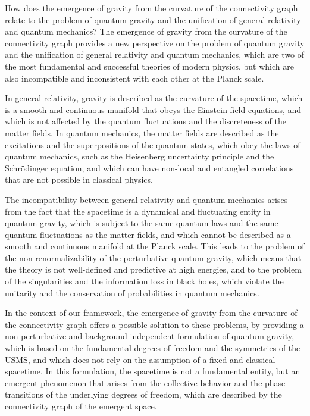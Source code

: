\begin{tcolorbox}[colback=green!5!white,colframe=green!75!black,title=Question]
    How does the emergence of gravity from the curvature of the connectivity graph relate to the problem of quantum gravity and the unification of general relativity and quantum mechanics?
    \tcblower
    The emergence of gravity from the curvature of the connectivity graph provides a new perspective on the problem of quantum gravity and the unification of general relativity and quantum mechanics, which are two of the most fundamental and successful theories of modern physics, but which are also incompatible and inconsistent with each other at the Planck scale.

    In general relativity, gravity is described as the curvature of the spacetime, which is a smooth and continuous manifold that obeys the Einstein field equations, and which is not affected by the quantum fluctuations and the discreteness of the matter fields. In quantum mechanics, the matter fields are described as the excitations and the superpositions of the quantum states, which obey the laws of quantum mechanics, such as the Heisenberg uncertainty principle and the Schrödinger equation, and which can have non-local and entangled correlations that are not possible in classical physics.

    The incompatibility between general relativity and quantum mechanics arises from the fact that the spacetime is a dynamical and fluctuating entity in quantum gravity, which is subject to the same quantum laws and the same quantum fluctuations as the matter fields, and which cannot be described as a smooth and continuous manifold at the Planck scale. This leads to the problem of the non-renormalizability of the perturbative quantum gravity, which means that the theory is not well-defined and predictive at high energies, and to the problem of the singularities and the information loss in black holes, which violate the unitarity and the conservation of probabilities in quantum mechanics.

    In the context of our framework, the emergence of gravity from the curvature of the connectivity graph offers a possible solution to these problems, by providing a non-perturbative and background-independent formulation of quantum gravity, which is based on the fundamental degrees of freedom and the symmetries of the USMS, and which does not rely on the assumption of a fixed and classical spacetime. In this formulation, the spacetime is not a fundamental entity, but an emergent phenomenon that arises from the collective behavior and the phase transitions of the underlying degrees of freedom, which are described by the connectivity graph of the emergent space.


\end{tcolorbox}
